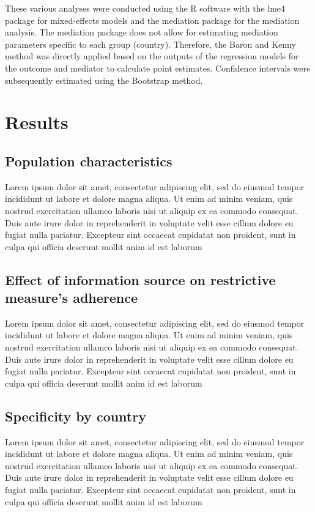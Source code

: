 \documentclass[11pt]{article} %
\begin{document}
These various analyses were conducted using the R software with the lme4 package for mixed-effects models and the mediation package for the mediation analysis. The mediation package does not allow for estimating mediation parameters specific to each group (country). Therefore, the Baron and Kenny method was directly applied based on the outputs of the regression models for the outcome and mediator to calculate point estimates. Confidence intervals were subsequently estimated using the Bootstrap method.


    \section{Results}
\subsection{Population characteristics}
Lorem ipsum dolor sit amet, consectetur adipiscing elit, sed do eiusmod tempor incididunt ut labore et dolore magna aliqua. Ut enim ad minim veniam, quis nostrud exercitation ullamco laboris nisi ut aliquip ex ea commodo consequat. Duis aute irure dolor in reprehenderit in voluptate velit esse cillum dolore eu fugiat nulla pariatur. Excepteur sint occaecat cupidatat non proident, sunt in culpa qui officia deserunt mollit anim id est laborum

\subsection{Effect of information source on restrictive measure's adherence} 
Lorem ipsum dolor sit amet, consectetur adipiscing elit, sed do eiusmod tempor incididunt ut labore et dolore magna aliqua. Ut enim ad minim veniam, quis nostrud exercitation ullamco laboris nisi ut aliquip ex ea commodo consequat. Duis aute irure dolor in reprehenderit in voluptate velit esse cillum dolore eu fugiat nulla pariatur. Excepteur sint occaecat cupidatat non proident, sunt in culpa qui officia deserunt mollit anim id est laborum

\subsection{Specificity by country}
Lorem ipsum dolor sit amet, consectetur adipiscing elit, sed do eiusmod tempor incididunt ut labore et dolore magna aliqua. Ut enim ad minim veniam, quis nostrud exercitation ullamco laboris nisi ut aliquip ex ea commodo consequat. Duis aute irure dolor in reprehenderit in voluptate velit esse cillum dolore eu fugiat nulla pariatur. Excepteur sint occaecat cupidatat non proident, sunt in culpa qui officia deserunt mollit anim id est laborum
\end{document}
